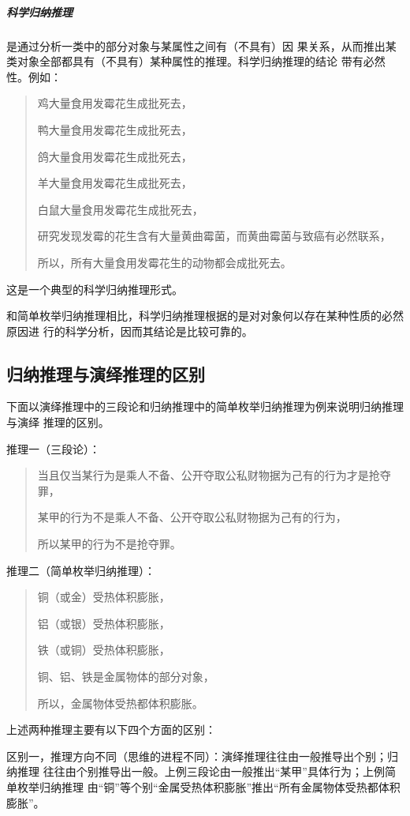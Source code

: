 \documentclass[final,oneside]{ctexbook}
\newenvironment{equotation}{\begin{quotation}\kaishu}{\end{quotation}}
\begin{document}
\subparagraph{科学归纳推理}是通过分析一类中的部分对象与某属性之间有（不具有）因
果关系，从而推出某类对象全部都具有（不具有）某种属性的推理。科学归纳推理的结论
带有必然性。例如：
\begin{equotation}
  鸡大量食用发霉花生成批死去，

  鸭大量食用发霉花生成批死去，

  鸽大量食用发霉花生成批死去，

  羊大量食用发霉花生成批死去，

  白鼠大量食用发霉花生成批死去，

  研究发现发霉的花生含有大量黄曲霉菌，而黄曲霉菌与致癌有必然联系，

  所以，所有大量食用发霉花生的动物都会成批死去。
\end{equotation}
这是一个典型的科学归纳推理形式。

和简单枚举归纳推理相比，科学归纳推理根据的是对对象何以存在某种性质的必然原因进
行的科学分析，因而其结论是比较可靠的。

\subsection{归纳推理与演绎推理的区别}

下面以演绎推理中的三段论和归纳推理中的简单枚举归纳推理为例来说明归纳推理与演绎
推理的区别。

推理一（三段论）：
\begin{equotation}
  当且仅当某行为是乘人不备、公开夺取公私财物据为己有的行为才是抢夺罪，

  某甲的行为不是乘人不备、公开夺取公私财物据为己有的行为，

  所以某甲的行为不是抢夺罪。
\end{equotation}

推理二（简单枚举归纳推理）：
\begin{equotation}
  铜（或金）受热体积膨胀，

  铝（或银）受热体积膨胀，

  铁（或铜）受热体积膨胀，

  铜、铝、铁是金属物体的部分对象，

  所以，金属物体受热都体积膨胀。
\end{equotation}

上述两种推理主要有以下四个方面的区别：

区别一，推理方向不同（思维的进程不同）：演绎推理往往由一般推导出个别；归纳推理
往往由个别推导出一般。上例三段论由一般推出“某甲”具体行为；上例简单枚举归纳推理
由“铜”等个别“金属受热体积膨胀”推出“所有金属物体受热都体积膨胀”。
\end{document}
